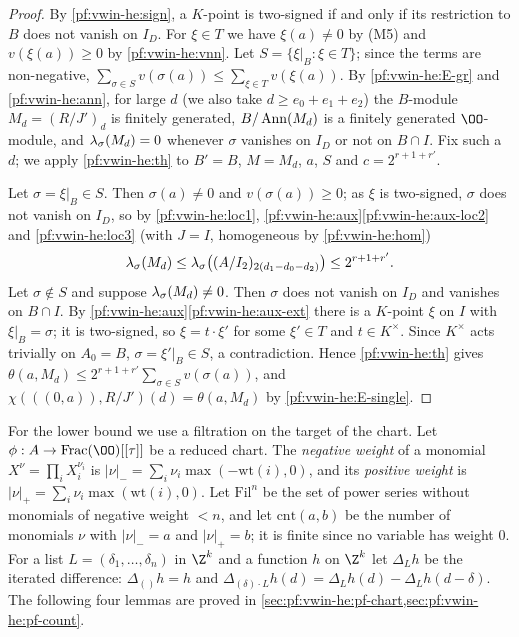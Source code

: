 \begin{proof}
By \cref{pf:vwin-he:sign}, a $K$-point is two-signed if and only if its restriction to $B$ does not vanish on $I_D$.
For $\xi\in T$ we have $\xi(a)\ne0$ by (M5) and $v(\xi(a))\ge0$ by \cref{pf:vwin-he:vnn}. Let
$S=\{\xi|_B:\xi\in T\}$; since the terms are non-negative,
$\sum_{\sigma\in S}v(\sigma(a))\le\sum_{\xi\in T}v(\xi(a))$. By \ref{pf:vwin-he:E-gr} and \cref{pf:vwin-he:ann}, for
large $d$ (we also take $d\ge e_0+e_1+e_2$) the $B$-module
$M_d=(R/J')_d$ is finitely generated, $B/\operatorname{Ann}(M_d)$ is a finitely generated $\OO$-module, and
$\lambda_\sigma(M_d)=0$ whenever $\sigma$ vanishes on $I_D$ or not on $B\cap I$. Fix such a $d$; we apply
\cref{pf:vwin-he:th} to $B'=B$, $M=M_d$, $a$, $S$ and $c=2^{r+1+r'}$.

Let $\sigma=\xi|_B\in S$. Then $\sigma(a)\ne0$ and $v(\sigma(a))\ge0$; as $\xi$ is two-signed, $\sigma$ does not vanish
on $I_D$, so by \cref{pf:vwin-he:loc1}, \cref{pf:vwin-he:aux}\ref{pf:vwin-he:aux-loc2} and \cref{pf:vwin-he:loc3}
(with $J=I$, homogeneous by \cref{pf:vwin-he:hom})
\[
 \lambda_\sigma(M_d)\le\lambda_\sigma\bigl((A/I_2)_{2(d_1-d_0-d_2)}\bigr)\le2^{r+1+r'}.
\]
Let $\sigma\notin S$ and suppose $\lambda_\sigma(M_d)\ne0$. Then $\sigma$ does not vanish on $I_D$ and vanishes on
$B\cap I$. By \cref{pf:vwin-he:aux}\ref{pf:vwin-he:aux-ext} there is a $K$-point $\xi$ on $I$ with $\xi|_B=\sigma$;
it is two-signed, so $\xi=t\cdot\xi'$ for some $\xi'\in T$ and $t\in K^\times$. Since $K^\times$ acts trivially on
$A_0=B$, $\sigma=\xi'|_B\in S$, a contradiction. Hence \cref{pf:vwin-he:th} gives
$\theta(a,M_d)\le2^{r+1+r'}\sum_{\sigma\in S}v(\sigma(a))$, and $\chi(((0,a)),R/J')(d)=\theta(a,M_d)$ by
\ref{pf:vwin-he:E-single}.
\end{proof}

For the lower bound we use a filtration on the target of the chart. Let $\phi:A\to\mathrm{Frac}(\OO)[[\tau]]$ be a
reduced chart. The \emph{negative weight} of a monomial $X^\nu=\prod_iX_i^{\nu_i}$ is
$|\nu|_-=\sum_i\nu_i\max(-\mathrm{wt}(i),0)$, and its \emph{positive weight} is
$|\nu|_+=\sum_i\nu_i\max(\mathrm{wt}(i),0)$. Let $\mathrm{Fil}^n$ be the set of power series without monomials of
negative weight $<n$, and let $\mathrm{cnt}(a,b)$ be the number of monomials $\nu$ with $|\nu|_-=a$ and $|\nu|_+=b$;
it is finite since no variable has weight $0$. For a list $L=(\delta_1,\dots,\delta_n)$ in $\Z^k$ and a function $h$
on $\Z^k$ let $\Delta_Lh$ be the iterated difference: $\Delta_{()}h=h$ and
$\Delta_{(\delta)\cdot L}h(d)=\Delta_Lh(d)-\Delta_Lh(d-\delta)$. The following four lemmas are proved in
\cref{sec:pf:vwin-he:pf-chart,sec:pf:vwin-he:pf-count}.

